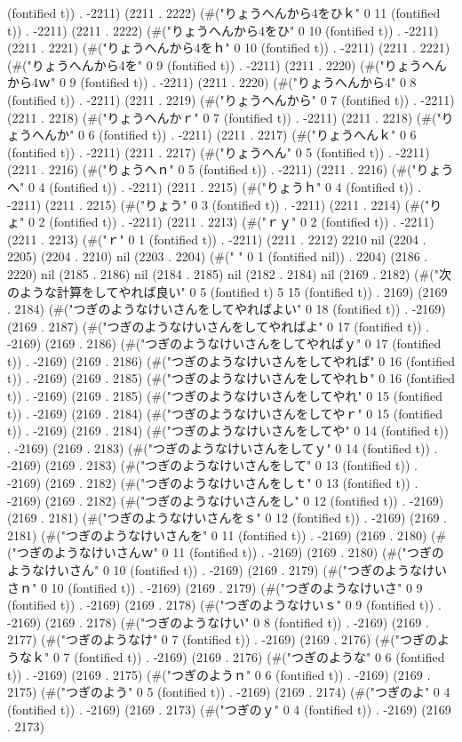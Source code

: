 (fontified t)) . -2211) (2211 . 2222) (#("りょうへんから4をひｋ" 0 11 (fontified t)) . -2211) (2211 . 2222) (#("りょうへんから4をひ" 0 10 (fontified t)) . -2211) (2211 . 2221) (#("りょうへんから4をｈ" 0 10 (fontified t)) . -2211) (2211 . 2221) (#("りょうへんから4を" 0 9 (fontified t)) . -2211) (2211 . 2220) (#("りょうへんから4ｗ" 0 9 (fontified t)) . -2211) (2211 . 2220) (#("りょうへんから4" 0 8 (fontified t)) . -2211) (2211 . 2219) (#("りょうへんから" 0 7 (fontified t)) . -2211) (2211 . 2218) (#("りょうへんかｒ" 0 7 (fontified t)) . -2211) (2211 . 2218) (#("りょうへんか" 0 6 (fontified t)) . -2211) (2211 . 2217) (#("りょうへんｋ" 0 6 (fontified t)) . -2211) (2211 . 2217) (#("りょうへん" 0 5 (fontified t)) . -2211) (2211 . 2216) (#("りょうへｎ" 0 5 (fontified t)) . -2211) (2211 . 2216) (#("りょうへ" 0 4 (fontified t)) . -2211) (2211 . 2215) (#("りょうｈ" 0 4 (fontified t)) . -2211) (2211 . 2215) (#("りょう" 0 3 (fontified t)) . -2211) (2211 . 2214) (#("りょ" 0 2 (fontified t)) . -2211) (2211 . 2213) (#("ｒｙ" 0 2 (fontified t)) . -2211) (2211 . 2213) (#("ｒ" 0 1 (fontified t)) . -2211) (2211 . 2212) 2210 nil (2204 . 2205) (2204 . 2210) nil (2203 . 2204) (#(" " 0 1 (fontified nil)) . 2204) (2186 . 2220) nil (2185 . 2186) nil (2184 . 2185) nil (2182 . 2184) nil (2169 . 2182) (#("次のような計算をしてやれば良い" 0 5 (fontified t) 5 15 (fontified t)) . 2169) (2169 . 2184) (#("つぎのようなけいさんをしてやればよい" 0 18 (fontified t)) . -2169) (2169 . 2187) (#("つぎのようなけいさんをしてやればよ" 0 17 (fontified t)) . -2169) (2169 . 2186) (#("つぎのようなけいさんをしてやればｙ" 0 17 (fontified t)) . -2169) (2169 . 2186) (#("つぎのようなけいさんをしてやれば" 0 16 (fontified t)) . -2169) (2169 . 2185) (#("つぎのようなけいさんをしてやれｂ" 0 16 (fontified t)) . -2169) (2169 . 2185) (#("つぎのようなけいさんをしてやれ" 0 15 (fontified t)) . -2169) (2169 . 2184) (#("つぎのようなけいさんをしてやｒ" 0 15 (fontified t)) . -2169) (2169 . 2184) (#("つぎのようなけいさんをしてや" 0 14 (fontified t)) . -2169) (2169 . 2183) (#("つぎのようなけいさんをしてｙ" 0 14 (fontified t)) . -2169) (2169 . 2183) (#("つぎのようなけいさんをして" 0 13 (fontified t)) . -2169) (2169 . 2182) (#("つぎのようなけいさんをしｔ" 0 13 (fontified t)) . -2169) (2169 . 2182) (#("つぎのようなけいさんをし" 0 12 (fontified t)) . -2169) (2169 . 2181) (#("つぎのようなけいさんをｓ" 0 12 (fontified t)) . -2169) (2169 . 2181) (#("つぎのようなけいさんを" 0 11 (fontified t)) . -2169) (2169 . 2180) (#("つぎのようなけいさんｗ" 0 11 (fontified t)) . -2169) (2169 . 2180) (#("つぎのようなけいさん" 0 10 (fontified t)) . -2169) (2169 . 2179) (#("つぎのようなけいさｎ" 0 10 (fontified t)) . -2169) (2169 . 2179) (#("つぎのようなけいさ" 0 9 (fontified t)) . -2169) (2169 . 2178) (#("つぎのようなけいｓ" 0 9 (fontified t)) . -2169) (2169 . 2178) (#("つぎのようなけい" 0 8 (fontified t)) . -2169) (2169 . 2177) (#("つぎのようなけ" 0 7 (fontified t)) . -2169) (2169 . 2176) (#("つぎのようなｋ" 0 7 (fontified t)) . -2169) (2169 . 2176) (#("つぎのような" 0 6 (fontified t)) . -2169) (2169 . 2175) (#("つぎのようｎ" 0 6 (fontified t)) . -2169) (2169 . 2175) (#("つぎのよう" 0 5 (fontified t)) . -2169) (2169 . 2174) (#("つぎのよ" 0 4 (fontified t)) . -2169) (2169 . 2173) (#("つぎのｙ" 0 4 (fontified t)) . -2169) (2169 . 2173) 